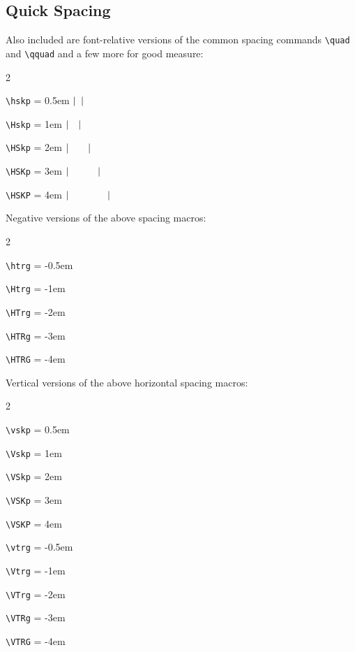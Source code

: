 \documentclass{article}
\begin{document}
\subsection*{Quick Spacing}
Also included are font-relative versions of the common spacing commands \verb|\quad| and \verb|\qquad| and a few more for good measure:
    \vtrg\begin{multicols}{2}
    \begin{compactitem}
        \item\verb|\hskp|  = 0.5em \hspace{5pt}$\vert\hskip.5em\relax\vert$
        \item\verb|\Hskp|  = 1em   \hspace{13pt}$\vert\hskip1em\relax\vert$
        \item\verb|\HSkp|  = 2em   \hspace{13pt}$\vert\hskip2em\relax\vert$
        \item\verb|\HSKp|  = 3em   \hspace{5pt}$\vert\hskip3em\relax\vert$
        \item\verb|\HSKP|  = 4em   \hspace{5pt}$\vert\hskip4em\relax\vert$
    \end{compactitem}
    \end{multicols}\Vtrg\vtrg
    
Negative versions of the above spacing macros:
	\vtrg\begin{multicols}{2}
	\begin{compactitem}
		\item\verb|\htrg|  = -0.5em
		\item\verb|\Htrg|  = -1em
		\item\verb|\HTrg|  = -2em
		\item\verb|\HTRg|  = -3em
		\item\verb|\HTRG|  = -4em
	\end{compactitem}
	\end{multicols}\Vtrg\vtrg
   
Vertical versions of the above horizontal spacing macros:
    \vtrg\begin{multicols}{2}
	\begin{compactitem}
		\item\verb|\vskp| = 0.5em 
		\item\verb|\Vskp| = 1em 
		\item\verb|\VSkp| = 2em 
		\item\verb|\VSKp| = 3em 
		\item\verb|\VSKP| = 4em 
		
		\item\verb|\vtrg| = -0.5em 
		\item\verb|\Vtrg| = -1em 
		\item\verb|\VTrg| = -2em 
		\item\verb|\VTRg| = -3em 
		\item\verb|\VTRG| = -4em 
	\end{compactitem}
	\end{multicols}\Vtrg\vtrg
\end{document}
